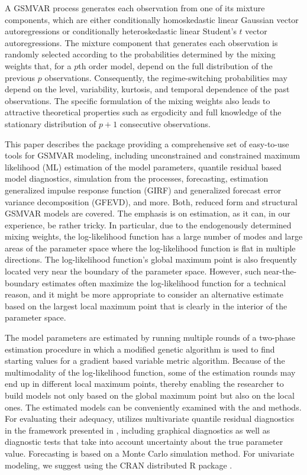 \documentclass[nojss]{jss}
\begin{document}
A GSMVAR process generates each observation from one of its mixture components, which are either conditionally homoskedastic linear Gaussian vector autoregressions or conditionally heteroskedastic linear Student's $t$ vector autoregressions. The mixture component that generates each observation is randomly selected according to the probabilities determined by the mixing weights that, for a $p$th order model, depend on the full distribution of the previous $p$ observations. Consequently, the regime-switching probabilities may depend on the level, variability, kurtosis, and temporal dependence of the past observations. The specific formulation of the mixing weights also leads to attractive theoretical properties such as ergodicity and full knowledge of the stationary distribution of $p+1$ consecutive observations.

This paper describes the  package  providing a comprehensive set of easy-to-use tools for GSMVAR modeling, including unconstrained and constrained maximum likelihood (ML) estimation of the model parameters, quantile residual based model diagnostics, simulation from the processes, forecasting, estimation generalized impulse response function (GIRF) and generalized forecast error variance decomposition (GFEVD), and more. Both, reduced form and structural GSMVAR models are covered. The emphasis is on estimation, as it can, in our experience, be rather tricky. In particular, due to the endogenously determined mixing weights, the log-likelihood function has a large number of modes and large areas of the parameter space where the log-likelihood function is flat in multiple directions. The log-likelihood function's global maximum point is also frequently located very near the boundary of the parameter space. However, such near-the-boundary estimates often maximize the log-likelihood function for a technical reason, and it might be more appropriate to consider an alternative estimate based on the largest local maximum point that is clearly in the interior of the parameter space.

The model parameters are estimated by running multiple rounds of a two-phase estimation procedure in which a modified genetic algorithm is used to find starting values for a gradient based variable metric algorithm. Because of the multimodality of the log-likelihood function, some of the estimation rounds may end up in different local maximum points, thereby enabling the researcher to build models not only based on the global maximum point but also on the local ones. The estimated models can be conveniently examined with the  and  methods. For evaluating their adequacy,  utilizes multivariate quantile residual diagnostics in the framework presented in \cite{Kalliovirta+Saikkonen:2010}, including graphical diagnostics as well as diagnostic tests that take into account uncertainty about the true parameter value. Forecasting is based on a Monte Carlo simulation method. For univariate modeling, we suggest using the CRAN distributed R package  \citep{uGMAR}.
\end{document}
